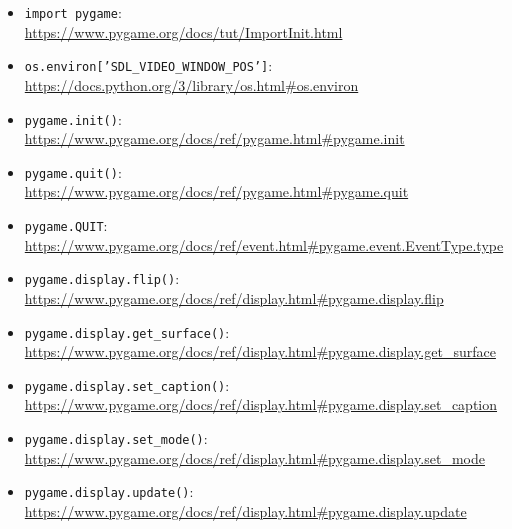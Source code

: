 \begin{itemize}
	\item \texttt{import pygame}:\\ \url{https://www.pygame.org/docs/tut/ImportInit.html}
	
	\item \texttt{os.environ['SDL\_VIDEO\_WINDOW\_POS']}:
    \\
	\url{https://docs.python.org/3/library/os.html#os.environ}
	
	\item \texttt{pygame.init()}:
	\\
	\url{https://www.pygame.org/docs/ref/pygame.html#pygame.init}
	
	\item \texttt{pygame.quit()}:
	\\
	\url{https://www.pygame.org/docs/ref/pygame.html#pygame.quit}

	\item \texttt{pygame.QUIT}:
	\\
    \url{https://www.pygame.org/docs/ref/event.html#pygame.event.EventType.type}
	
	\item \texttt{pygame.display.flip()}:
	\\
	\url{https://www.pygame.org/docs/ref/display.html#pygame.display.flip}
	
	\item \texttt{pygame.display.get\_surface()}:
	\\
	\url{https://www.pygame.org/docs/ref/display.html#pygame.display.get_surface}

	\item \texttt{pygame.display.set\_caption()}:
	\\
	\url{https://www.pygame.org/docs/ref/display.html#pygame.display.set_caption}

	\item \texttt{pygame.display.set\_mode()}:
	\\
	\url{https://www.pygame.org/docs/ref/display.html#pygame.display.set_mode}
	
	\item \texttt{pygame.display.update()}:
	\\
	\url{https://www.pygame.org/docs/ref/display.html#pygame.display.update}
	

\end{itemize}
